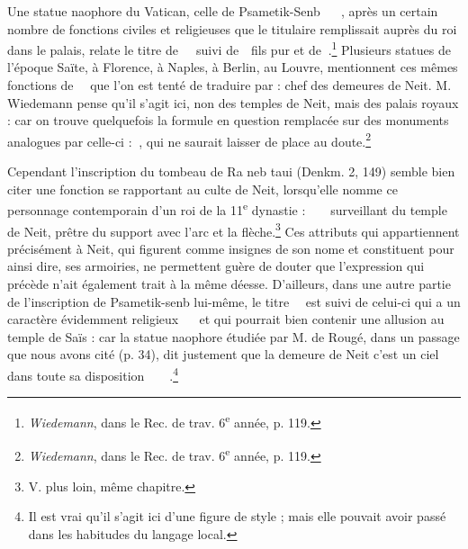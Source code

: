 \documentclass[a4paper, 11pt, oneside]{article}
\newcommand*\hieroAAAH{}
\newcommand*\hieroAAAI{}
\newcommand*\hieroAAAO{}
\newcommand*\hieroAAAQ{}
\newcommand*\hieroAABR{}
\newcommand*\hieroAACM{}
\newcommand*\hieroAACN{\raisebox{1ex}{}}
\newcommand*\hieroAACS{}
\newcommand*\hieroAADY{\raisebox{0.3ex}{}}
\newcommand*\hieroAAHA{}
\newcommand*\hieroAAHC{}
\newcommand*\hieroAAHK{}
\newcommand*\hieroAAHR{}
\newcommand*\hieroAAHS{}
\newcommand*\hieroAAHZ{}
\newcommand*\hieroAALJ{}
\newcommand*\hieroAAOH{\raisebox{0.3ex}{}}
\newcommand*\hieroAAOR{}
\newcommand*\hieroAAOX{}
\newcommand*\hieroAAPB{}
\newcommand*\hieroAAPC{\raisebox{0.5ex}{}}
\newcommand*\hieroAAPH{}
\newcommand*\hieroAAQA{}
\newcommand*\hieroAAQB{}
\newcommand*\hieroAAQC{}
\newcommand*\hieroAAQD{}
\newcommand*\hieroAAQE{}
\newcommand*\hieroAAQF{}
\newcommand*\hieroAAQG{}
\newcommand*\hieroAAQH{}
\newcommand*\hieroAAQI{}
\begin{document}
Une statue naophore du Vatican, celle de Psametik-Senb $\hieroAAAH\:\hieroAAQA\:\hieroAAQB\allowbreak\:\hieroAACM\:\hieroAALJ\allowbreak\:\hieroAAAQ\:\hieroAAAO$, après un certain nombre de fonctions civiles et religieuses que le titulaire remplissait auprès du roi dans le palais, relate le titre de $\hieroAAOR\:\hieroAAHA\allowbreak\:\hieroAAOH\:\hieroAAQC$ suivi de $\hieroAAAI\:\hieroAADY$ fils pur et de $\hieroAAOX\:\hieroAAQD$.\footnote{\emph{Wiedemann}, dans le Rec. de trav. 6\textsuperscript{e} année, p. 119.} Plusieurs statues de l'époque Saïte, à Florence, à Naples, à Berlin, au Louvre, mentionnent ces mêmes fonctions de $\hieroAAOR\:\hieroAAHA\allowbreak\:\hieroAAAQ\:\hieroAAQC$ que l'on est tenté de traduire par : chef des demeures de Neit. M. Wiedemann pense qu'il s'agit ici, non des temples de Neit, mais des palais royaux : car on trouve quelquefois la formule en question remplacée sur des monuments analogues par celle-ci : $\hieroAAQE\:\hieroAAQC$, qui ne saurait laisser de place au doute.\footnote{\emph{Wiedemann}, dans le Rec. de trav. 6\textsuperscript{e} année, p. 119.}

Cependant l'inscription du tombeau de Ra neb taui (Denkm. 2, 149) semble bien citer une fonction se rapportant au culte de Neit, lorsqu'elle nomme ce personnage contemporain d'un roi de la 11\textsuperscript{e} dynastie : $\hieroAAQI\:\hieroAAHA\:\hieroAAQC\allowbreak\:\hieroAAHC\:\hieroAAQF\allowbreak\:\hieroAABR\:\hieroAAQG$ surveillant du temple de Neit, prêtre du support avec l'arc et la flèche.\footnote{V. plus loin, même chapitre.} Ces attributs qui appartiennent précisément à Neit, qui figurent comme insignes de son nome et constituent pour ainsi dire, ses armoiries, ne permettent guère de douter que l'expression qui précède n'ait également trait à la même déesse. D'ailleurs, dans une autre partie de l'inscription de Psametik-senb lui-même, le titre $\hieroAAOR\:\hieroAAHA\allowbreak\:\hieroAAAQ\:\hieroAAQC$ est suivi de celui-ci qui a un caractère évidemment religieux $\hieroAAPB\:\hieroAACS\:\hieroAAQH\allowbreak\:\hieroAACN\:\hieroAAPH$ et qui pourrait bien contenir une allusion au temple de Saïs : car la statue naophore étudiée par M. de Rougé, dans un passage que nous avons cité (p. 34), dit justement que la demeure de Neit c'est un ciel dans toute sa disposition $\hieroAAAO\:\hieroAAHK\:\hieroAAPC\allowbreak\:\hieroAAHZ\:\hieroAABR\:\hieroAACS\allowbreak\:\hieroAAHR\:\hieroAAHS$.\footnote{Il est vrai qu'il s'agit ici d'une figure de style ; mais elle pouvait avoir passé dans les habitudes du langage local.}
\end{document}
